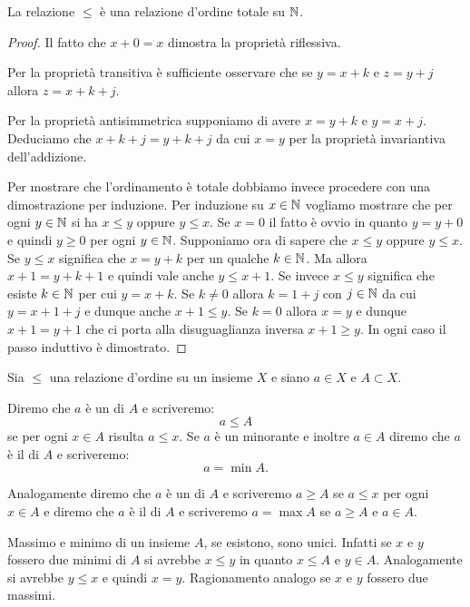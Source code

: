 \begin{theorem}
La relazione $\le$ è una relazione d'ordine totale su $\mathbb N$.
\end{theorem}
%
\begin{proof}
  Il fatto che $x+0=x$ dimostra la proprietà riflessiva.
  
  Per la proprietà transitiva è sufficiente osservare
  che se $y=x+k$ e $z=y+j$ allora $z=x+k+j$.

  Per la proprietà antisimmetrica supponiamo di avere $x=y+k$ 
  e $y=x+j$. Deduciamo che $x+k+j = y +k+j$ da cui $x=y$
  per la proprietà invariantiva dell'addizione.
  
  Per mostrare che l'ordinamento è totale dobbiamo invece 
  procedere con una dimostrazione per induzione. 
  Per induzione su $x\in \mathbb N$ vogliamo mostrare 
  che per ogni $y\in \mathbb N$ si ha $x\le y$ oppure $y\le x$. 
  Se $x=0$ il fatto è ovvio in quanto $y=y+0$ e quindi $y\ge 0$
  per ogni $y\in \mathbb N$.
  Supponiamo ora di sapere che $x\le y$ oppure $y\le x$.
  Se $y\le x$ significa che $x = y + k$ per un qualche 
  $k\in \mathbb N$. Ma allora $x+1 = y + k + 1$ e quindi 
  vale anche $y\le x+1$. 
  Se invece $x\le y$ significa che esiste $k\in \mathbb N$ 
  per cui $y=x+k$. Se $k\neq 0$ allora $k=1+j$ con $j\in \mathbb N$
  da cui $y=x+1+j$ e dunque anche $x+1\le y$.
  Se $k=0$ allora $x=y$ e dunque $x+1=y+1$ che ci porta 
  alla disuguaglianza inversa $x+1\ge y$.
  In ogni caso il passo induttivo è dimostrato.
\end{proof}

\begin{definition}
  \label{def:minorante}%
  \label{def:minimo}%
  Sia $\le$ una relazione d'ordine su un insieme $X$ e siano 
  $a\in X$ e $A\subset X$.

  Diremo che $a$ è un  di $A$ e scriveremo:
  \[
    a \le A
  \]
  se per ogni $x\in A$ risulta $a\le x$. 
  Se $a$ è un minorante e inoltre $a\in A$ diremo 
  che $a$ è il  di $A$ e scriveremo:
  \[
    a = \min A.  
  \] 

  Analogamente diremo che $a$ è un 
  di $A$ e scriveremo $a \ge A$ se $a\le x$ per ogni $x\in A$ 
  e diremo che $a$ è il  di $A$ 
  e scriveremo $a=\max A$ se $a\ge A$ e $a\in A$.
\end{definition}

Massimo e minimo di un insieme $A$, se esistono, sono unici.
Infatti se $x$ e $y$ fossero due minimi di $A$ si avrebbe $x\le y$ in
quanto $x\le A$ e $y\in A$. Analogamente si avrebbe $y\le x$ e
quindi $x=y$. Ragionamento analogo se $x$ e $y$ fossero due massimi.

